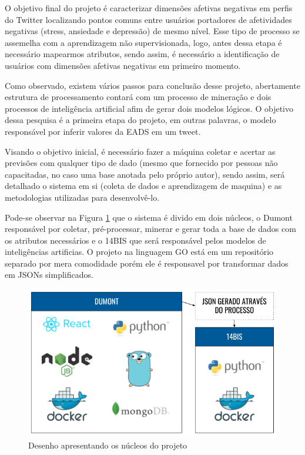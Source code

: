 O objetivo final do projeto é caracterizar dimensões afetivas negativas em perfis do Twitter localizando pontos comuns entre usuários portadores de afetividades negativas (stress, ansiedade e depressão) de mesmo nível. Esse tipo de processo se assemelha com a aprendizagem não supervisionada, logo, antes dessa etapa é necessário mapearmos atributos, sendo assim, é necessário a identificação de usuários com dimensões afetivas negativas em primeiro momento.

Como observado, existem vários passos para conclusão desse projeto, abertamente estrutura de processamento contará com um processo de mineração e dois processos de inteligência artificial afim de gerar dois modelos lógicos. O objetivo dessa pesquisa é a primeira etapa do projeto, em outras palavras, o modelo responsável por inferir valores da EADS em um tweet.

Visando o objetivo inicial, é necessário fazer a máquina coletar e acertar as previsões com qualquer tipo de dado (mesmo que fornecido por pessoas não capacitadas, no caso uma base anotada pelo próprio autor), sendo assim, será detalhado o sistema em si (coleta de dados e aprendizagem de maquina) e as metodologias utilizadas para desenvolvê-lo.

Pode-se observar na Figura \ref{fig:tecnologias} que o sistema é divido em dois núcleos, o Dumont responsável por coletar, pré-processar, minerar e gerar toda a base de dados com os atributos necessários e o 14BIS que será responsável pelos modelos de inteligências artificias. O projeto na linguagem GO está em um repositório separado por mera comodidade porém ele é responsavel por transformar dados em JSONs simplificados.

\begin{figure}
    \centering
    \includegraphics[width=1\textwidth]{imagens/tecnologias.png}
    \caption{Desenho apresentando os núcleos do projeto}
    \label{fig:tecnologias}
\end{figure}

